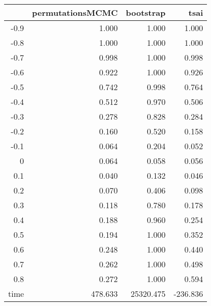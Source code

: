 \begin{table}[ht]
\centering
\begingroup\tiny
\begin{tabular}{rrrr}
  \hline
 & permutationsMCMC & bootstrap & tsai \\ 
  \hline
-0.9 & 1.000 & 1.000 & 1.000 \\ 
  -0.8 & 1.000 & 1.000 & 1.000 \\ 
  -0.7 & 0.998 & 1.000 & 0.998 \\ 
  -0.6 & 0.922 & 1.000 & 0.926 \\ 
  -0.5 & 0.742 & 0.998 & 0.764 \\ 
  -0.4 & 0.512 & 0.970 & 0.506 \\ 
  -0.3 & 0.278 & 0.828 & 0.284 \\ 
  -0.2 & 0.160 & 0.520 & 0.158 \\ 
  -0.1 & 0.064 & 0.204 & 0.052 \\ 
  0 & 0.064 & 0.058 & 0.056 \\ 
  0.1 & 0.040 & 0.132 & 0.046 \\ 
  0.2 & 0.070 & 0.406 & 0.098 \\ 
  0.3 & 0.118 & 0.780 & 0.178 \\ 
  0.4 & 0.188 & 0.960 & 0.254 \\ 
  0.5 & 0.194 & 1.000 & 0.352 \\ 
  0.6 & 0.248 & 1.000 & 0.440 \\ 
  0.7 & 0.262 & 1.000 & 0.498 \\ 
  0.8 & 0.272 & 1.000 & 0.594 \\ 
  time & 478.633 & 25320.475 & -236.836 \\ 
   \hline
\end{tabular}
\endgroup
\end{table}
